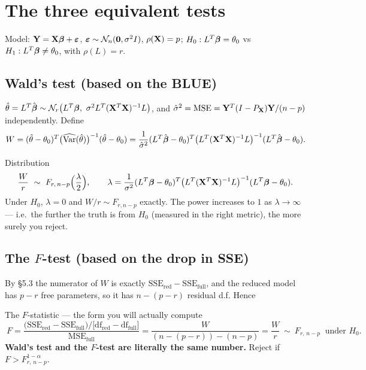 \documentclass[11pt]{article}
\begin{document}
\section{The three equivalent tests}

Model: $\mathbf{Y}=\mathbf{X}\boldsymbol{\beta}+\boldsymbol{\varepsilon}$, $\boldsymbol{\varepsilon}\sim\mathcal{N}_n(\mathbf{0},\sigma^2I)$, $\rho(\mathbf{X})=p$;
$H_0:L^T\boldsymbol{\beta}=\theta_0$ vs $H_1:L^T\boldsymbol{\beta}\ne\theta_0$, with $\rho(L)=r$.

\subsection{Wald's test (based on the BLUE)}

$\hat\theta=L^T\hat\bb\sim\N_r\big(L^T\bb,\ \sigma^2L^T(\bX^T\bX)^{-1}L\big)$, and
$\hat\sigma^2=\mathrm{MSE}=\mathbf{Y}^T(I-P_{\mathbf{X}})\mathbf{Y}/(n-p)$ independently. Define
\[
  W=(\hat\theta-\theta_0)^T\big(\widehat{\operatorname{Var}}(\hat\theta)\big)^{-1}(\hat\theta-\theta_0)
   =\frac{1}{\hat\sigma^2}(L^T\hat{\boldsymbol{\beta}}-\theta_0)^T\big(L^T(\mathbf{X}^T\mathbf{X})^{-1}L\big)^{-1}(L^T\hat{\boldsymbol{\beta}}-\theta_0).
\]

\begin{idea}{Distribution}
\[
  \frac{W}{r}\ \sim\ F_{r,\,n-p}\Big(\frac{\lambda}{2}\Big),\qquad
  \lambda=\frac{1}{\sigma^2}(L^T\bb-\theta_0)^T\big(L^T(\bX^T\bX)^{-1}L\big)^{-1}(L^T\bb-\theta_0).
\]
Under $H_0$, $\lambda=0$ and $W/r\sim F_{r,n-p}$ exactly. The power increases to $1$ as
$\lambda\to\infty$ --- i.e.\ the further the truth is from $H_0$ (measured in the right
metric), the more surely you reject.
\end{idea}

\subsection{The $F$-test (based on the drop in SSE)}

By \S5.3 the numerator of $W$ is exactly $\mathrm{SSE}_{\text{red}}-\mathrm{SSE}_{\text{full}}$, and
the reduced model has $p-r$ free parameters, so it has $n-(p-r)$ residual d.f. Hence

\begin{recipe}{The $F$-statistic --- the form you will actually compute}
\[
  \boxed{\
  F=\frac{\big(\mathrm{SSE}_{\text{red}}-\mathrm{SSE}_{\text{full}}\big)\big/\big[\mathrm{df}_{\text{red}}-\mathrm{df}_{\text{full}}\big]}
        {\mathrm{MSE}_{\text{full}}}
   =\frac{W}{(n-(p-r))-(n-p)}=\frac{W}{r}\ \sim\ F_{r,\,n-p}\ \text{ under } H_0 .}
\]
\textbf{Wald's test and the $F$-test are literally the same number.} Reject if
$F>F^{1-\alpha}_{r,\,n-p}$.
\end{recipe}
\end{document}

